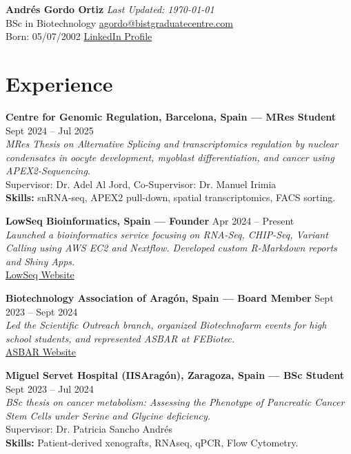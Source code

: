 \documentclass[a4paper,10pt]{article}
\begin{document}
\noindent\textbf{Andrés Gordo Ortiz} \hfill \textit{Last Updated: \today} \\
BSc in Biotechnology \hfill \href{mailto:agordo@bistgraduatecentre.com}{agordo@bistgraduatecentre.com} \\
Born: 05/07/2002 \hfill \href{https://www.linkedin.com/in/andgortiz}{LinkedIn Profile} \\
\vspace{5pt}

\section*{Experience}

\noindent\textbf{Centre for Genomic Regulation, Barcelona, Spain — MRes Student} \hfill Sept 2024 – Jul 2025 \\
\textit{MRes Thesis on Alternative Splicing and transcriptomics regulation by nuclear condensates in oocyte development, myoblast differentiation, and cancer using APEX2-Sequencing.} \\
Supervisor: Dr. Adel Al Jord, Co-Supervisor: Dr. Manuel Irimia \\
\textbf{Skills:} snRNA-seq, APEX2 pull-down, spatial transcriptomics, FACS sorting.

\vspace{10pt}

\noindent\textbf{LowSeq Bioinformatics, Spain — Founder} \hfill Apr 2024 – Present \\
\textit{Launched a bioinformatics service focusing on RNA-Seq, CHIP-Seq, Variant Calling using AWS EC2 and Nextflow. Developed custom R-Markdown reports and Shiny Apps.} \\
\href{https://lowseqbioinformatics.com}{LowSeq Website}

\vspace{10pt}

\noindent\textbf{Biotechnology Association of Aragón, Spain — Board Member} \hfill Sept 2023 – Sept 2024 \\
\textit{Led the Scientific Outreach branch, organized Biotechnofarm events for high school students, and represented ASBAR at FEBiotec.} \\
\href{https://asbaragon.es/}{ASBAR Website}

\vspace{10pt}

\noindent\textbf{Miguel Servet Hospital (IISAragón), Zaragoza, Spain — BSc Student} \hfill Sept 2023 – Jul 2024 \\
\textit{BSc thesis on cancer metabolism: Assessing the Phenotype of Pancreatic Cancer Stem Cells under Serine and Glycine deficiency.} \\
Supervisor: Dr. Patricia Sancho Andrés \\
\textbf{Skills:} Patient-derived xenografts, RNAseq, qPCR, Flow Cytometry.
\end{document}
